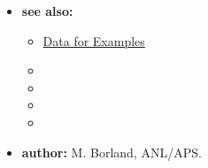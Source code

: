 \begin{itemize}
\begin{itemize}
    \end{itemize}
\item {\bf see also:}
    \begin{itemize}
    \item \hyperref[exampleData]{Data for Examples}
    \item {}
    \item {}
    \item {}
    \item {}
    \end{itemize}
\item {\bf author:} M. Borland, ANL/APS.
\end{itemize}



